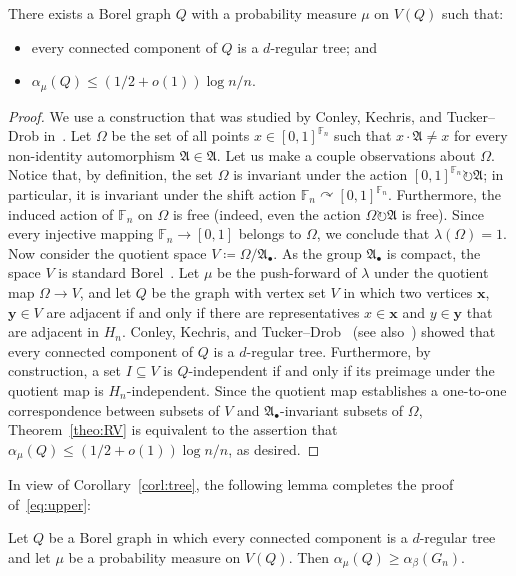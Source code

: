 \documentclass[AHL,Unicode,longabstracts,published]{cedram}
\newcommand{\0}{\varnothing}
\renewcommand{\leq}{\leqslant}
\renewcommand{\geq}{\geqslant}
\newcommand{\defeq}{\coloneqq}
\newcommand{\racts}{\circlearrowright}
\newcommand{\F}{\mathbb{F}}
\newcommand{\frkA}{\mathfrak{A}}
\begin{document}
\begin{coro}\label{corl:tree}
There exists a Borel graph $Q$ with a probability measure $\mu$ on $V(Q)$ such that:
\begin{itemize}
\item every connected component of $Q$ is a $d$-regular tree; and
\item $\alpha_\mu(Q) \leq (1/2 + o(1)) \log n/n$.
\end{itemize}
\end{coro}


\begin{proof}
We use a construction that was studied by Conley, Kechris, and Tucker--Drob in~\cite{Ultra}. Let $\Omega$ be the set of all points $x \in [0,1]^{\F_n}$ such that $x \cdot \frkA \neq x$ for every non-identity automorphism $\frkA \in \frkA$. Let us make a couple observations about $\Omega$. Notice that, by definition, the set $\Omega$ is invariant under the action $[0,1]^{\F_n} \racts \frkA$; in particular, it is invariant under the shift action $\F_n \curvearrowright [0,1]^{\F_n}$. Furthermore, the induced action of $\F_n$ on $\Omega$ is free (indeed, even the action $\Omega \racts \frkA$ is free). Since every injective mapping $\F_n \to [0,1]$ belongs to $\Omega$, we conclude that $\lambda(\Omega) = 1$. Now consider the quotient space $V
\defeq \Omega/\frkA_\bullet$. As the group $\frkA_\bullet$ is compact, the space $V$ is standard Borel~\cite[paragraph preceding Lemma~7.8]{Ultra}. Let $\mu$ be the push-forward of $\lambda$ under the quotient map $\Omega \to V$, and let $Q$ be the graph with vertex set $V$ in which two vertices $\bm{x}$, $\bm{y} \in V$ are adjacent if and only if there are representatives $x \in \bm{x}$ and $y \in \bm{y}$ that are adjacent in $H_n$. Conley, Kechris, and Tucker--Drob~\cite[Lemma~7.9]{Ultra} (see also~\cite[Proposition~1.9]{Thornton}) showed that every connected component of $Q$ is a $d$-regular tree. Furthermore, by construction, a set $I \subseteq V$ is $Q$-independent if and only if its preimage under the quotient map is $H_n$-independent. Since the quotient map establishes a one-to-one correspondence between subsets of $V$ and $\frkA_\bullet$-invariant subsets of $\Omega$, Theorem~\ref{theo:RV} is equivalent to the assertion that $\alpha_\mu(Q) \leq (1/2 + o(1)) \log n/n$, as desired.
\end{proof}

In view of Corollary~\ref{corl:tree}, the following lemma completes the proof of~\eqref{eq:upper}:

\begin{lemma}\label{lemma:AW}
Let $Q$ be a Borel graph in which every connected component is a $d$-regular tree and let $\mu$ be a probability measure on $V(Q)$. Then $\alpha_\mu(Q) \geq \alpha_\beta(G_n)$.
\end{lemma}
\end{document}
